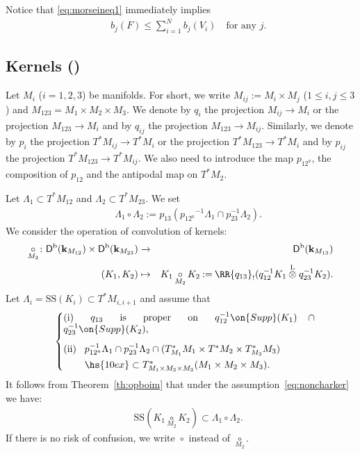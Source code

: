 \documentclass[12pt,leqno]{article}
\theoremstyle{definition}
\newcommand{\cor}{{\bf k}}
\renewcommand{\to}[1][]{\xrightarrow[]{#1}}
\newcommand{\ltens}[1][]{\mathbin{\overset{\mathrm{L}}\otimes}_{#1}}
\newcommand{\conv}[1][]{\mathop{\circ}\limits_{#1}}
\newcommand{\reim}[1]{\RR{#1}_!}
\newcommand{\opb}[1]{#1^{-1}}
\newcommand{\eqdot}{\mathbin{:=}}
\newcommand{\cl}{\colon}
\newcommand{\ba}{\begin{array}}
\newcommand{\ea}{\end{array}}
\newcommand{\eq}{\begin{eqnarray}}
\newcommand{\eneq}{\end{eqnarray}}
\newcommand{\eqn}{\begin{eqnarray*}}
\newcommand{\eneqn}{\end{eqnarray*}}
\newcommand{\Supp}{\on{Supp}}
\newcommand{\Der}[1][]{\mathsf{D}^{#1}}
\newcommand{\Derb}{\Der[\mathrm{b}]}
\newcommand{\SSi}{\mathrm{SS}}
\numberwithin{equation}{section}
\begin{document}
Notice that \eqref{eq:morseineq1} immediately implies
\eq\label{eq:morseineq2}
&&b_j(F)\leq \sum_{i=1}^N b_j(V_i)\quad\text{for any $j$.}
\eneq


\subsection{Kernels (\cite[\S 3.6]{KS90})}
Let $M_i$ ($i=1,2,3$) be manifolds. For short, we write $M_{ij}\eqdot M_i\times M_j$ 
($1\leq i,j\leq3$) and $M_{123}=M_1\times M_2\times M_3$. 
We denote by $q_i$  the projection $M_{ij}\to M_i$ or the projection $M_{123}\to M_i$
and by $q_{ij}$ the projection $M_{123}\to M_{ij}$. Similarly, we denote by
$p_i$  the projection $T^*M_{ij}\to T^*M_i$ or the projection $T^*M_{123}\to T^*M_i$
and by $p_{ij}$ the projection $T^*M_{123}\to T^*M_{ij}$. We also need
to introduce the map $p_{12^a}$, the composition of $p_{12}$ and the
antipodal map on $T^*M_2$. 

Let $\Lambda_1\subset T^*M_{12}$ and $\Lambda_2\subset T^*M_{23}$. We
set 
\eq\label{eq:convolution_of_sets}
&&\Lambda_1\conv\Lambda_2\eqdot
p_{13}(\opb{{p_{12^a}}}\Lambda_1\cap\opb{p_{23}}\Lambda_2).
\eneq
We consider the operation of convolution of kernels:
\eqn
\conv[M_2]\cl\Derb(\cor_{M_{12}})\times\Derb(\cor_{M_{23}})&\to&\Derb(\cor_{M_{13}})\\
(K_1,K_2)&\mapsto&K_1\conv[M_2] K_2\eqdot
\reim{q_{13}}(\opb{q_{12}}K_1\ltens\opb{q_{23}}K_2).
\eneqn
Let  $\Lambda_i=\SSi(K_i)\subset T^*M_{i,i+1}$  and assume that 
\eq\label{eq:noncharker}
&&\left\{
\parbox{60ex}{
(i) $q_{13}$ is proper on $\opb{q_{12}}\Supp(K_1)\cap\opb{q_{23}}\Supp(K_2)$,
\\[2ex]
(ii) 
$\ba[t]{l}
\opb{p_{12^a}}\Lambda_1\cap\opb{p_{23}}\Lambda_2
\cap (T^*_{M_1}M_1\times T^*M_2\times T^*_{M_3}M_3)\\[1ex]
\hs{10ex} \subset T^*_{M_1\times M_2\times M_3}(M_1\times M_2\times M_3).
\ea$
}\right.
\eneq
It follows from Theorem~\ref{th:opboim} that under the
assumption~\eqref{eq:noncharker} we have:
\eq
&&\SSi(K_1\conv[M_2] K_2)\subset \Lambda_1\conv\Lambda_2.
\label{eq: estss}
\eneq
If there is no risk of confusion, we write $\conv$ instead of
$\conv[M_2]$. 
\end{document}
